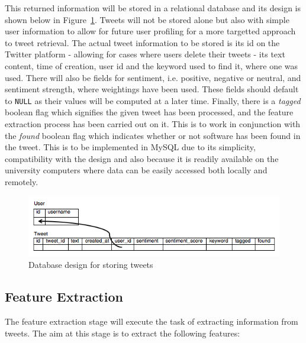 This returned information will be stored in a relational database and its design is shown below in Figure~\ref{fig:db}. Tweets will not be stored alone but also with simple user information to allow for future user profiling for a more targetted approach to tweet retrieval. The actual tweet information to be stored is its id on the Twitter platform - allowing for cases where users delete their tweets - its text content, time of creation, user id and the keyword used to find it, where one was used. There will also be fields for sentiment, i.e. positive, negative or neutral, and sentiment strength, where weightings have been used. These fields should default to \texttt{NULL} as their values will be computed at a later time. Finally, there is a \emph{tagged} boolean flag which signifies the given tweet has been processed, and the feature extraction process has been carried out on it. This is to work in conjunction with the \emph{found} boolean flag which indicates whether or not software has been found in the tweet. This is to be implemented in MySQL due to its simplicity, compatibility with the design and also because it is readily available on the university computers where data can be easily accessed both locally and remotely.

\begin{figure}[h]
\begin{center}
\includegraphics[width=12cm]{db}
\end{center}
\caption{Database design for storing tweets}
\label{fig:db}
\end{figure}

\subsection{Feature Extraction}
\label{sec:arc2}
The feature extraction stage will execute the task of extracting information from tweets. The aim at this stage is to extract the following features:

